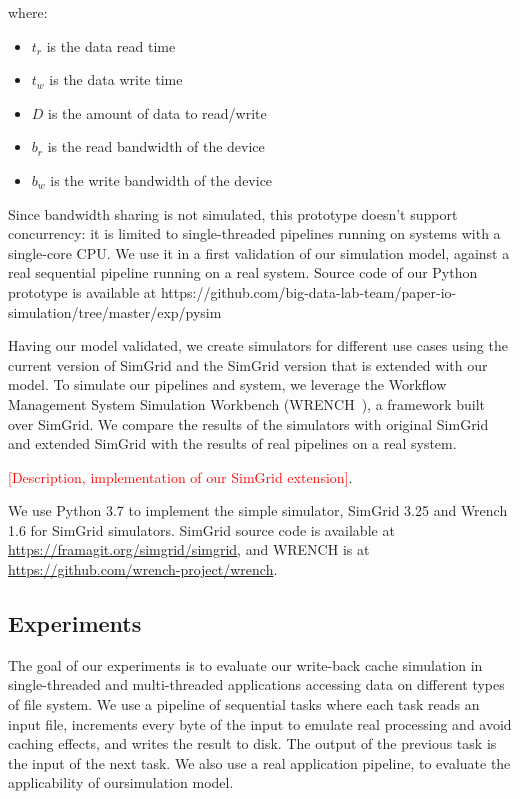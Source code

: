 \documentclass[conference]{IEEEtran}
\begin{document}
			where:
			\begin{itemize}
				\item $t_{r}$ is the data read time
				\item $t_{w}$ is the data write time
				\item $D$ is the amount of data to read/write
				\item $b_r$ is the read bandwidth of the device
				\item $b_w$ is the write bandwidth of the device
			\end{itemize}			

			Since bandwidth sharing is not simulated, this prototype doesn't support 
			concurrency: it is limited to single-threaded pipelines running on systems 
			with a single-core CPU. We use it in a first validation of our simulation 
			model, against a real sequential pipeline running on a real system.
			Source code of our Python prototype is available at 
			https://github.com/big-data-lab-team/paper-io-simulation/tree/master/exp/pysim
			
			Having our model validated, we create simulators for different use cases 
			using the current version of SimGrid and the SimGrid version that is 
			extended with our model. To simulate our pipelines and system, we leverage 
			the Workflow Management System Simulation Workbench 
			(WRENCH~\cite{wrench}), a framework  built over SimGrid.
		    We compare the results of the simulators with
			original SimGrid and extended SimGrid with the results of real
			pipelines on a real system. 
			
			\textcolor{red}{[Description, implementation of our SimGrid extension]}. 
		
			We use Python 3.7 to implement the simple simulator, SimGrid 3.25
			and Wrench 1.6 for SimGrid simulators. SimGrid source code is
			available at \url{https://framagit.org/simgrid/simgrid}, and WRENCH
			is at \url{https://github.com/wrench-project/wrench}.
			
		\subsection{Experiments}
		
			The goal of our experiments is to evaluate our write-back cache
			simulation in single-threaded and multi-threaded applications
			accessing data on different types of file system. We use a pipeline
			of sequential tasks where each task reads an input file, increments
			every byte of the input to emulate real processing and avoid caching
			effects, and writes the result to disk. The output of the previous
			task is the input of the next task. We also use a real application 
			pipeline, to evaluate the applicability of oursimulation model. 
			
\end{document}

